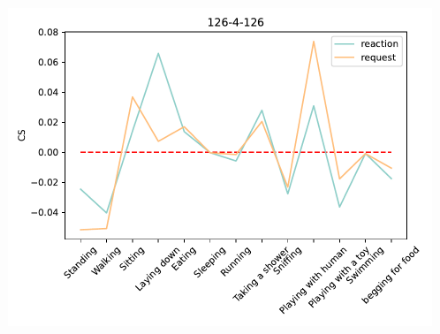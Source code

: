 \begin{figure}[ht]
\begin{minipage}[b]{.3\linewidth}
			\includegraphics[width=0.99\linewidth]{./35word/126-4-126.pdf}
		\end{minipage}
		

\end{figure}
